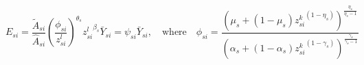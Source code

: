 \begin{equation}
    E_{si} = {\frac{\tilde{A}_{si}}{\hat{A}_{si}}(\frac{\phi_{si}}{z^{l}_{si}})^{\theta_s} {z^{l}_{si}}^{\beta_s}} \bar{Y}_{si} = \psi_{si}\bar{Y}_{si}, \quad \text{where} \quad \phi_{si}  = \frac{(\mu_s  + (1-\mu_s){z^k_{si}}^{(1-\eta_s )})^ {\frac{\eta_s}{\eta_s-1}}}{(\alpha_s  + (1-\alpha_s){z^k_{si}}^{(1-\gamma_s )}) ^{\frac{\gamma_s}{\gamma_s-1}}} 
\end{equation}